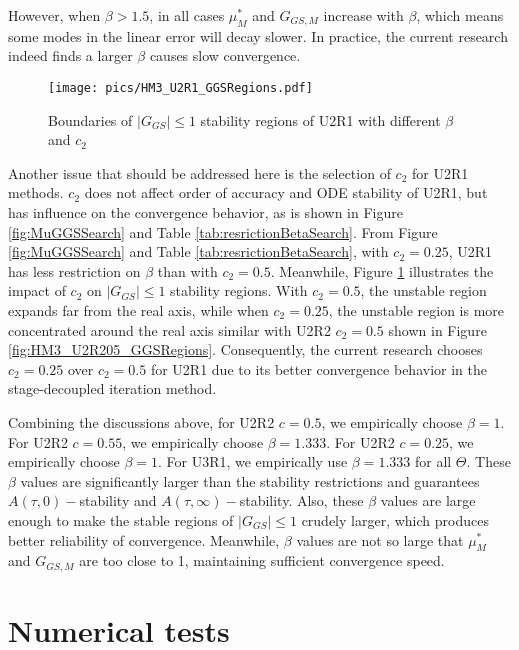 \documentclass[preprint,12pt]{elsarticle}
\begin{document}
However, when $\beta>1.5$, in all cases $\mu^*_{M}$ and $G_{GS,M}$ increase
with $\beta$, which means some modes in the linear error will
decay slower. In practice, the current research indeed finds a larger
$\beta$ causes slow convergence.

\begin{figure}[htbp]
    \centering
    \texttt{[image: pics/HM3\_U2R1\_GGSRegions.pdf]}
    \caption[]{Boundaries of $|G_{GS}|\leq1$ stability regions of U2R1 with different $\beta$ and $c_2$}
    \label{fig:HM3_U2R1_GGSRegions}
\end{figure}
Another issue that should be addressed here is the
selection of $c_2$ for U2R1 methods. $c_2$ does not
affect order of accuracy and ODE stability of U2R1, but
has influence on the convergence behavior, as is shown
in Figure \ref{fig:MuGGSSearch} and Table \ref{tab:resrictionBetaSearch}.
From Figure \ref{fig:MuGGSSearch} and Table \ref{tab:resrictionBetaSearch},
with $c_2=0.25$, U2R1 has less restriction on $\beta$ than with $c_2=0.5$.
Meanwhile, Figure \ref{fig:HM3_U2R1_GGSRegions} illustrates the
impact of $c_2$ on $|G_{GS}|\leq1$ stability regions.
With $c_2=0.5$, the unstable region expands far from the real axis,
while when $c_2=0.25$, the unstable region is
more concentrated around the real axis similar with U2R2 $c_2=0.5$
shown in Figure \ref{fig:HM3_U2R205_GGSRegions}.
Consequently, the current research chooses $c_2=0.25$ over $c_2=0.5$
for U2R1 due to its better convergence behavior in
the stage-decoupled iteration method.



Combining the discussions above,
for U2R2 $c=0.5$, we empirically choose $\beta = 1$.
For U2R2 $c=0.55$, we empirically choose $\beta = 1.333$.
For U2R2 $c=0.25$, we empirically choose $\beta = 1$.
For U3R1, we empirically use $\beta = 1.333$ for all $\Theta$.
These $\beta$ values are significantly larger than the
stability restrictions and guarantees
$A(\tau,0)-$stability and
$A(\tau,\infty)-$stability.
Also, these  $\beta$ values are large enough to make the stable regions of $|G_{GS}|\leq1$
crudely larger, which produces better reliability of convergence.
Meanwhile, $\beta$ values are not so large that $\mu^*_{M}$ and $G_{GS,M}$
are too close to 1, maintaining sufficient convergence speed.



\section{Numerical tests}
\label{sec :Results}
\end{document}
